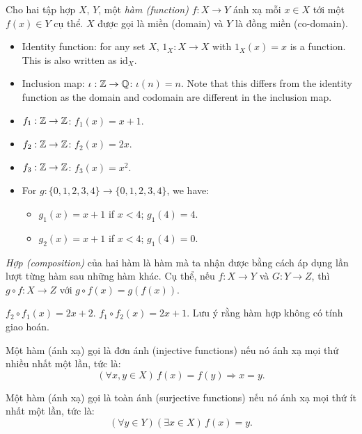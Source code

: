 \begin{defi}
  Cho hai tập hợp $X$, $Y$, một \emph{hàm (function)} $f: X \rightarrow Y$ ánh xạ mỗi $x\in X$ tới một $f(x)\in Y$ cụ thể. $X$ được gọi là miền (domain) và $Y$ là đồng miền (co-domain).
\end{defi}
\begin{eg}\leavevmode
  \begin{itemize}
    \item Identity function: for any set $X$, $1_X: X \rightarrow X$ with $1_X(x) = x$ is a function. This is also written as $\mathrm{id}_X$.
    \item Inclusion map: $\iota: \mathbb{Z} \rightarrow \mathbb{Q}$: $\iota(n) = n$. Note that this differs from the identity function as the domain and codomain are different in the inclusion map.
    \item $f_1: \mathbb{Z} \rightarrow \mathbb{Z}$: $f_1(x) = x + 1$.
    \item $f_2: \mathbb{Z} \rightarrow \mathbb{Z}$: $f_2(x) = 2x$.
    \item $f_3: \mathbb{Z} \rightarrow \mathbb{Z}$: $f_3(x) = x^2$.
    \item For $g: \{0, 1, 2, 3, 4\} \rightarrow \{0, 1, 2, 3, 4\}$, we have:
      \begin{itemize}
        \item $g_1(x) = x + 1$ if $x < 4$; $g_1(4) = 4$.
        \item $g_2(x) = x + 1$ if $x < 4$; $g_1(4) = 0$.
      \end{itemize}
  \end{itemize}
\end{eg}
\begin{defi}
  \emph{Hợp (composition)} của hai hàm là hàm mà ta nhận được bằng cách áp dụng lần lượt từng hàm sau những hàm khác. Cụ thể, nếu $f: X \rightarrow Y$ và $G: Y\rightarrow Z$, thì $g\circ f: X \rightarrow Z$ với $g\circ f(x) = g(f(x) )$.
\end{defi}
\begin{eg}
  $f_2\circ f_1(x) = 2x + 2$. $f_1\circ f_2 (x) = 2x + 1$. Lưu ý rằng hàm hợp không có tính giao hoán.
\end{eg}
\begin{defi}
  Một hàm (ánh xạ) gọi là đơn ánh (injective functions) nếu nó ánh xạ mọi thứ nhiều nhất một lần, tức là:
  \[
    (\forall x, y\in X)\,f(x) = f(y)\Rightarrow x = y.
  \]
\end{defi}

\begin{defi}
  Một hàm (ánh xạ) gọi là toàn ánh (surjective functions) nếu nó ánh xạ mọi thứ ít nhất một lần, tức là:
  \[
    (\forall y\in Y)(\exists x\in X)\,f(x) = y.
  \]
\end{defi}

